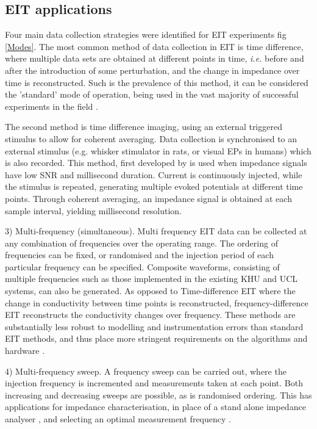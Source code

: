 \subsection{EIT applications}
Four main data collection strategies were identified for EIT experiments fig \ref{Modes}.  The most common method of data collection in EIT is time difference, where multiple data sets are obtained at different points in time, \emph{i.e.} before and after the introduction of some perturbation, and the change in impedance over time is reconstructed. Such is the prevalence of this method, it can be considered the 'standard' mode of operation, being used in the vast majority of successful experiments in the field \cite{bayford2012bioimpedance}.

The second method is time difference imaging, using an external triggered stimulus to allow for coherent averaging. Data collection is synchronised to an external stimulus (e.g. whisker stimulator in rats, or visual EPs in humans) which is also recorded. This method, first developed by \citet{Oh2011} is used when impedance signals have low SNR and millisecond duration. Current is continuously injected, while the stimulus is repeated, generating multiple evoked potentials at different time points. Through coherent averaging, an impedance signal is obtained at each sample interval, yielding millisecond resolution. 

3) Multi-frequency (simultaneous). Multi frequency EIT data can be collected at any combination of frequencies over the operating range. The ordering of frequencies can be fixed, or randomised and the injection period of each particular frequency can be specified. Composite waveforms, consisting of multiple frequencies such as those implemented in the existing KHU \cite{Hun_Wi_2014} and UCL \cite{McEwan_2006} systems, can also be generated. As opposed to Time-difference EIT where the change in conductivity between time points is reconstructed, frequency-difference EIT reconstructs the conductivity changes over frequency. These methods are substantially less robust to modelling and instrumentation errors than standard EIT methods, and thus place more stringent requirements on the algorithms and hardware \cite{Ahn2011} \cite{Malone2014}.

4) Multi-frequency sweep. A frequency sweep can be carried out, where the injection frequency is incremented and measurements taken at each point. Both increasing and decreasing sweeps are possible, as is randomised ordering. This has applications for impedance characterisation, in place of a stand alone impedance analyser \cite{Gabriel_2009}, and selecting an optimal measurement frequency \cite{VongerichtenASantosGAristovichK2013}.